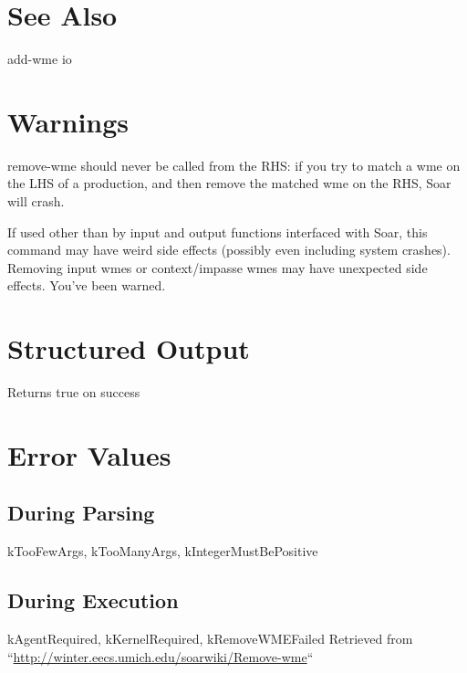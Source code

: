 \documentclass[10pt]{article}
\begin{document}
\section*{ See Also }


 add-wme io
\section*{ Warnings }


 remove-wme should never be called from the RHS: if you try to match a wme on the LHS of a production, and then remove the matched wme on the RHS, Soar will crash. 


 If used other than by input and output functions interfaced with Soar, this command may have weird side effects (possibly even including system crashes). Removing input wmes or context/impasse wmes may have unexpected side effects. You've been warned. 
\section*{ Structured Output }


 Returns true on success 
\section*{ Error Values }
\subsection*{ During Parsing }


 kTooFewArgs, kTooManyArgs, kIntegerMustBePositive
\subsection*{ During Execution }


 kAgentRequired, kKernelRequired, kRemoveWMEFailed Retrieved from ``\url{http://winter.eecs.umich.edu/soarwiki/Remove-wme}``
\end{document}
